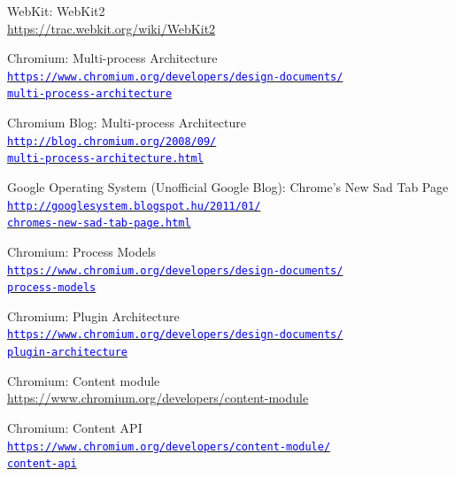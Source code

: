 \documentclass[12pt]{report}
\let\orighref\href
\renewcommand{\href}[2]{%
    \orighref{#1}{\textcolor{blue}{\texttt{#2}}}
}
\let\origurl\url
\renewcommand{\url}[1]{%
    \textcolor{blue}{\origurl{#1}}
}
\begin{document}
\begin{thebibliography}{9}
        WebKit: WebKit2 \\
        \url{https://trac.webkit.org/wiki/WebKit2}

        Chromium: Multi-process Architecture \\
        \href{https://www.chromium.org/developers/design-documents/multi-process-architecture}
        {https://www.chromium.org/developers/design-documents/\\
        multi-process-architecture}

        Chromium Blog: Multi-process Architecture \\
        \href{http://blog.chromium.org/2008/09/multi-process-architecture.html}
        {http://blog.chromium.org/2008/09/\\
        multi-process-architecture.html}

        Google Operating System (Unofficial Google Blog): Chrome's New Sad Tab Page \\
        \href{http://googlesystem.blogspot.hu/2011/01/chromes-new-sad-tab-page.html}
        {http://googlesystem.blogspot.hu/2011/01/\\
        chromes-new-sad-tab-page.html}

        Chromium: Process Models \\
        \href{https://www.chromium.org/developers/design-documents/process-models}
        {https://www.chromium.org/developers/design-documents/\\
        process-models}

        Chromium: Plugin Architecture \\
        \href{https://www.chromium.org/developers/design-documents/plugin-architecture}
        {https://www.chromium.org/developers/design-documents/\\
        plugin-architecture}

        Chromium: Content module \\
        \url{https://www.chromium.org/developers/content-module}

        Chromium: Content API \\
        \href{https://www.chromium.org/developers/content-module/content-api}
        {https://www.chromium.org/developers/content-module/\\
        content-api}

\end{thebibliography}
\end{document}
